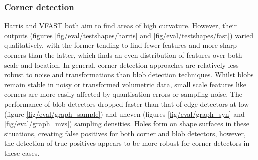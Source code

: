 \subsubsection{Corner detection} Harris and VFAST both aim to find areas of high curvature. However, their outputs (figures \ref{fig/eval/testshapes/harris} and \ref{fig/eval/testshapes/fast}) varied qualitatively, with the former tending to find fewer features and more sharp corners than the latter, which finds an even distribution of features over both scale and location. In general, corner detection approaches are relatively less robust to noise and transformations than blob detection techniques. Whilst blobs remain stable in noisy or transformed volumetric data, small scale features like corners are more easily affected by quantisation errors or sampling noise. 
The performance of blob detectors dropped faster than that of edge detectors at low (figure \ref{fig/eval/graph_sample}) and uneven (figures \ref{fig/eval/graph_syn} and \ref{fig/eval/graph_mvs}) sampling densities. Holes form on shape surfaces in these situations, creating false positives for both corner and blob detectors, however, the detection of true positives appears to be more robust for corner detectors in these cases. 

